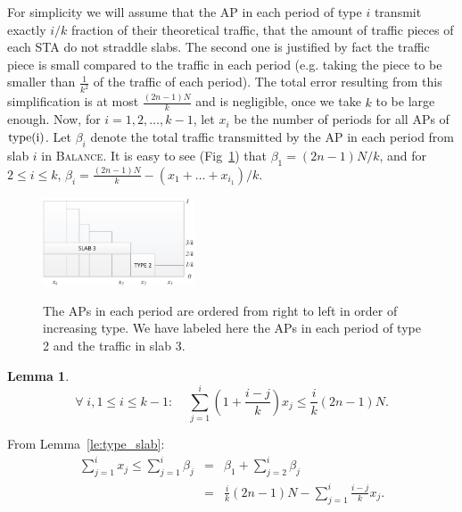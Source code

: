 \documentclass[conference]{IEEEtran}
\def\figwidth{0.4\textwidth}
\newtheorem{lemma}{Lemma}
\def \type {\rm{type}}
\begin{document}
  For simplicity we will assume that the AP in each period of type $i$ transmit exactly $i/k$ fraction of their theoretical traffic, that the amount of traffic pieces of each STA do not straddle slabs.  The second one is justified by fact the traffic piece is small compared to the traffic in each period (e.g. taking the piece to be smaller than $\frac{1}{k^2}$ of the traffic of each period).  The total error resulting from this simplification is at most $\frac{(2n-1)N}{k}$ and is negligible, once we take $k$ to be large enough.  Now, for $i=1,2,\ldots,k-1$, let $x_i$ be the number of periods for all APs of $\type(i)$.  Let $\beta_i$ denote the total traffic transmitted by the AP in each period from slab $i$ in \textsc{Balance}.  It is easy to see (Fig~\ref{fig:analysis_amount}) that $\beta_1=(2n-1)N/k$, and for $2\leq i\leq k$, $\beta_i=\frac{(2n-1)N}{k}-(x_1+\ldots+x_{i_1})/k$.
  \begin{figure}[!ht]
    \centering
    \includegraphics[width=\figwidth]{analysis.eps}\\
    \caption{The APs in each period are ordered from right to left in order of increasing type. We have labeled here the APs in each period of type 2 and the traffic in slab 3.}\label{fig:analysis_amount}
  \end{figure}
  \begin{lemma}
    \begin{equation*}
      \forall\; i,1\leq i\leq k-1:\;\;\;\;\sum_{j=1}^i(1+\frac{i-j}{k})x_j\leq \frac{i}{k}(2n-1)N.
    \end{equation*}
  \end{lemma}

  \begin{IEEEproof}
    From Lemma~\ref{le:type_slab}:
    \begin{eqnarray*}
      \sum_{j=1}^{i}x_j\leq \sum_{j=1}^{i}\beta_j&=&\beta_1+\sum_{j=2}^{i}\beta_j\\
      &=&\frac{i}{k}(2n-1)N-\sum_{j=1}^{i}\frac{i-j}{k}x_j.\\
    \end{eqnarray*}

  \end{IEEEproof}
\end{document}
